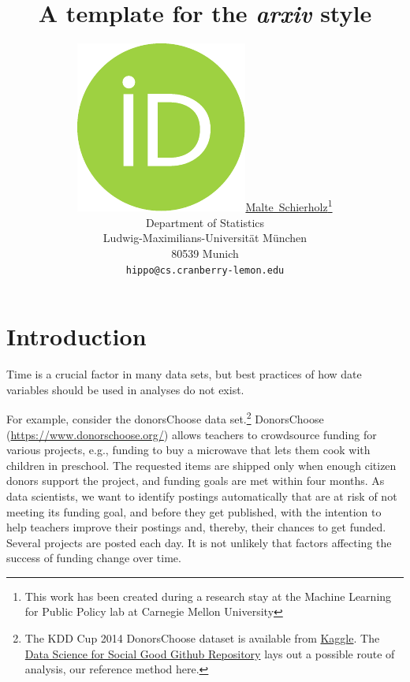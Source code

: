 \documentclass{article}
\title{A template for the \emph{arxiv} style}
\author{ \href{https://orcid.org/0000-0003-4058-1543}{\includegraphics[scale=0.06]{orcid.pdf}\hspace{1mm}Malte~Schierholz}\thanks{This work has been created during a research stay at the Machine Learning for Public Policy lab at Carnegie Mellon University} \\
	Department of Statistics\\
	Ludwig-Maximilians-Universität München\\
	80539 Munich \\
	\texttt{hippo@cs.cranberry-lemon.edu} \\
}
\begin{document}
\maketitle

\begin{abstract}
	\lipsum[1]
\end{abstract}




\section{Introduction}\label{sec:introduction}

Time is a crucial factor in many data sets, but best practices of how date variables should be used in analyses do not exist.

For example, consider the donorsChoose data set.\footnote{The KDD Cup 2014 DonorsChoose dataset is available from \href{https://www.kaggle.com/c/kdd-cup-2014-predicting-excitement-at-donors-choose/data}{Kaggle}. The \href{https://github.com/dssg/donors-choose}{Data Science for Social Good Github Repository} lays out a possible route of analysis, our reference method here.} DonorsChoose (\url{https://www.donorschoose.org/}) allows teachers to crowdsource funding for various projects, e.g., funding to buy a microwave that lets them cook with children in preschool. The requested items are shipped only when enough citizen donors support the project, and funding goals are met within four months. As data scientists, we want to identify postings automatically that are at risk of not meeting its funding goal, and before they get published, with the intention to help teachers improve their postings and, thereby, their chances to get funded. Several projects are posted each day. It is not unlikely that factors affecting the success of funding change over time.
\end{document}
